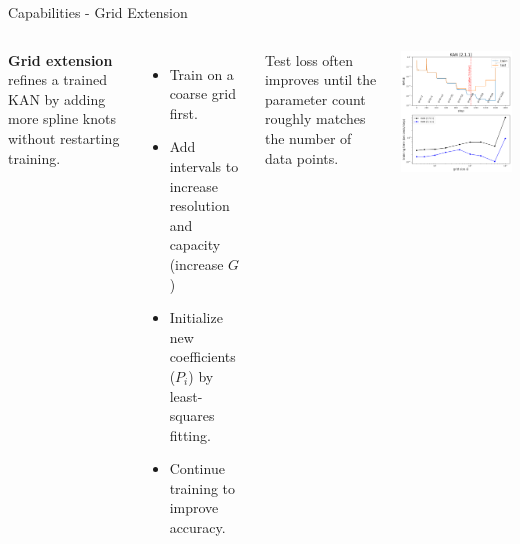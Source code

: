 \documentclass[aspectratio=169]{beamer}
\begin{document}

\begin{frame}{Capabilities - Grid Extension}
	\begin{columns}[T,onlytextwidth]
		
		\textbf{Grid extension} refines a trained KAN by adding more spline knots without restarting training.
		
		\begin{itemize}
			\item Train on a coarse grid first.
			\item Add intervals to increase resolution and capacity (increase $G$)
			\item Initialize new coefficients ($P_i$) by least-squares fitting.
			\item Continue training to improve accuracy.
		\end{itemize}
		
		Test loss often improves until the parameter count roughly matches the number of data points.
		
		\centering
		\includegraphics[height=0.8\textheight]{../images/grid_extension.png}
		
	\end{columns}
\end{frame}
\end{document}
